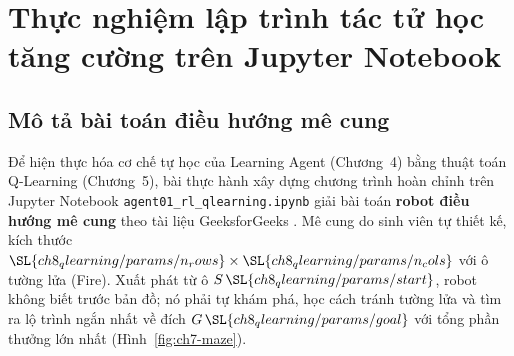 \chapter{Thực nghiệm lập trình tác tử học tăng cường trên Jupyter Notebook}\label{ch:thucnghiem}

\section{Mô tả bài toán điều hướng mê cung}
Để hiện thực hóa cơ chế tự học của Learning Agent (Chương~4) bằng thuật toán Q-Learning (Chương~5), bài thực hành xây
dựng chương trình hoàn chỉnh trên Jupyter Notebook \texttt{agent01\_rl\_qlearning.ipynb} giải bài toán \textbf{robot
điều hướng mê cung} theo tài liệu GeeksforGeeks \cite{gfg_rl}. Mê cung do sinh viên tự thiết kế, kích thước
$\SL{ch8_qlearning/params/n_rows} \times \SL{ch8_qlearning/params/n_cols}$ với  ô tường lửa
(Fire). Xuất phát từ ô $S\,\SL{ch8_qlearning/params/start}$, robot không biết trước bản đồ; nó phải tự khám phá, học cách
tránh tường lửa và tìm ra lộ trình ngắn nhất về đích $G\,\SL{ch8_qlearning/params/goal}$ với tổng phần thưởng lớn nhất
(Hình~\ref{fig:ch7-maze}).


